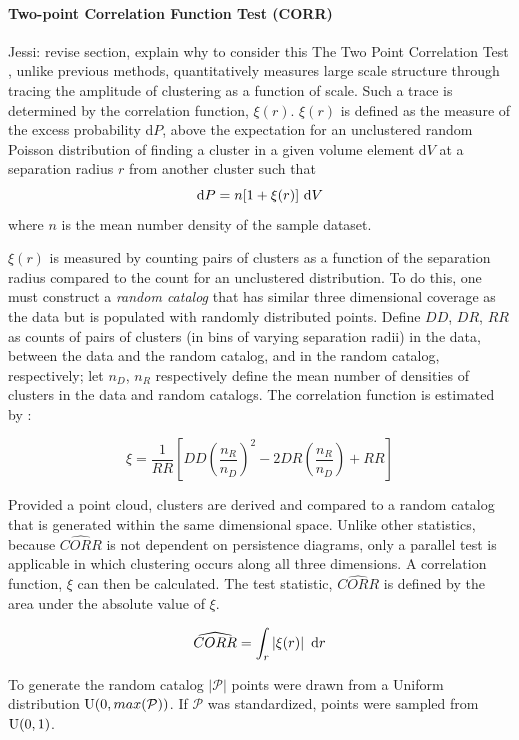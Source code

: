 \documentclass[12pt]{article}
\begin{document}
\paragraph{Two-point Correlation Function Test (CORR)}
{\color{red}  Jessi:  revise section, explain why to consider this}
The Two Point Correlation Test \cite{landy1993bias}, unlike previous methods, quantitatively measures large scale structure through tracing the amplitude of clustering as a function of scale. Such a trace is determined by the correlation function, $\xi(r)$. $\xi(r)$ is defined as the measure of the excess probability d$P$, above the expectation for an unclustered random Poisson distribution of finding a cluster in a given volume element d$V$ at a separation radius $r$ from another cluster such that 
\[ \textup{d}P = n[1 + \xi(r)] \textup{ d}V \] where $n$ is the mean number density of the sample dataset.

$\xi(r)$ is measured by counting pairs of clusters as a function of the separation radius compared to the count for an unclustered distribution. To do this, one must construct a \textit{random catalog} that has similar three dimensional coverage as the data but is populated with randomly distributed points. Define $DD$, $DR$, $RR$ as counts of pairs of clusters (in bins of varying separation radii) in the data, between the data and the random catalog, and in the random catalog, respectively; let $n_{D}$, $n_{R}$ respectively define the mean number of densities of clusters in the data and random catalogs. The correlation function is estimated by \cite{landy1993bias}:

\[ \xi = \frac{1}{RR}\left[DD\left(\frac{n_{R}}{n_{D}}\right)^{2} - 2DR\left(\frac{n_{R}}{n_{D}}\right) + RR\right] \]

Provided a point cloud, clusters are derived and compared to a random catalog that is generated within the same dimensional space. Unlike other statistics, because $\widehat{CORR}$ is not dependent on persistence diagrams, only a parallel test is applicable in which clustering occurs along all three dimensions. A correlation function, $\xi$ can then be calculated. The test statistic, $\widehat{CORR}$ is defined by the area under the absolute value of $\xi$.

\[ \widehat{CORR} = \int_{r} \left | \xi(r) \right | \textup{ d}r \]

To generate the random catalog $\left | \mathcal P \right |$ points were drawn from a Uniform distribution $\textup{U}(0, max(\mathcal P))$. If $\mathcal P$ was standardized, points were sampled from $\textup{U}(0, 1)$. 
\end{document}
